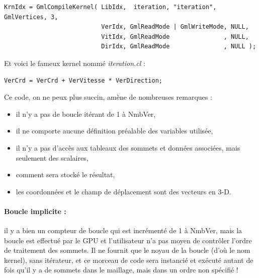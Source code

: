 \documentclass[a4paper,12pt]{article}
\begin{document}
\begin{tt}
\begin{verbatim}
KrnIdx = GmlCompileKernel( LibIdx,  iteration, "iteration", GmlVertices, 3,
                           VerIdx, GmlReadMode | GmlWriteMode, NULL,
                           VitIdx, GmlReadMode               , NULL,
                           DirIdx, GmlReadMode               , NULL );
\end{verbatim}
\end{tt}
\normalfont

Et voici le fameux kernel nommé \emph{iteration.cl} : 

\begin{tt}
\begin{verbatim}
VerCrd = VerCrd + VerVitesse * VerDirection;
\end{verbatim}
\end{tt}
\normalfont

Ce code, on ne peux plus succin, amène de nombreuses remarques :

\begin{itemize}
\item il n'y a pas de boucle itérant de 1 à NmbVer,
\item il ne comporte aucune définition préalable des variables utilisée,
\item il n'y a pas d'accès aux tableaux des sommets et données associées, mais seulement des scalaires,
\item comment sera stocké le résultat,
\item les coordonnées et le champ de déplacement sont des vecteurs en 3-D.
\end{itemize}

\paragraph{Boucle implicite : } il y a bien un compteur de boucle qui est incrémenté de 1 à NmbVer, mais la boucle est effectué par le GPU et l'utilisateur n'a pas moyen de contrôler l'ordre de traitement des sommets. Il ne fournit que le noyau de la boucle (d'où le nom kernel), sans itérateur, et ce morceau de code sera instancié et exécuté autant de fois qu'il y a de sommets dans le maillage, mais dans un ordre non spécifié !
\end{document}
